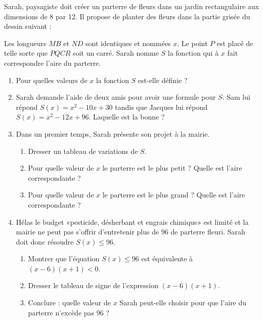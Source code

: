 
\begin{exercice}\label{exosmath-0715}

    Sarah, paysagiste doit créer un parterre de fleurs dans un jardin rectangulaire aux dimensions de \unit{8}{\meter} par \unit{12}{\meter}. Il propose de planter des fleurs dans la partie grisée du dessin suivant :

\begin{center}
   
\end{center}

Les longueurs \( MB\) et \( ND\) sont identiques et nommées \( x\). Le point \( P\) est placé de telle sorte que \( PQCR\) soit un carré. Sarah nomme \( S\) la fonction qui à \( x\) fait correspondre l'aire du parterre.

\begin{enumerate}
    \item
        Pour quelles valeurs de \( x\) la fonction \( S\) est-elle définie ?
    \item
        Sarah demande l'aide de deux amis pour avoir une formule pour \( S\). Sam lui répond \( S(x)=x^2-10x+30\) tandis que Jacques lui répond \( S(x)=x^2-12x+96\). Laquelle est la bonne ?
    \item
        Dans un premier temps, Sarah présente son projet à la mairie.
        \begin{enumerate}
            \item
                Dresser un tableau de variations de \( S\).
            \item
                Pour quelle valeur de \( x\) le parterre est le plus petit ? Quelle est l'aire correspondante ?
            \item
                Pour quelle valeur de \( x\) le parterre est le plus grand ? Quelle est l'aire correspondante ?
        \end{enumerate} 
    \item
        Hélas le budget «pesticide, désherbant et engrais chimique» est limité et la mairie ne peut pas s'offrir d'entretenir plus de \unit{96}{\squared\meter} de parterre fleuri. Sarah doit donc résoudre \( S(x)\leq 96\).
        \begin{enumerate}
            \item
                Montrer que l'équation \( S(x)\leq 96\) est équivalente à \( (x-6)(x+1)<0\).
            \item
                Dresser le tableau de signe de l'expression \( (x-6)(x+1)\).
            \item
                Conclure : quelle valeur de \( x\) Sarah peut-elle choisir pour que l'aire du parterre n'excède pas \unit{96}{\squared\meter} ?
        \end{enumerate}
\end{enumerate}

\end{exercice}
